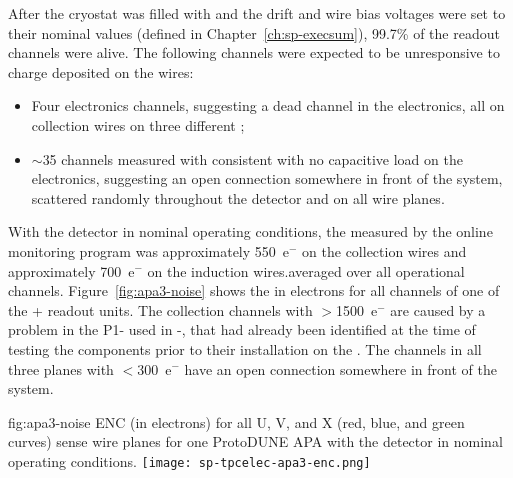 After the cryostat was filled with  and the drift and wire 
bias voltages were set to their nominal values (defined in Chapter~\ref{ch:sp-execsum}), 
99.7\% of the  readout channels were alive. The following 
channels were expected to be unresponsive to charge deposited on the wires:
\begin{itemize}
\item{Four electronics channels, suggesting a dead channel in the electronics, 
all on collection wires on three different ;}
\item{$\sim$35 channels measured with consistent with no capacitive load 
on the  electronics, suggesting an open connection somewhere in 
front of the  system, scattered randomly throughout the detector 
and on all wire planes.}
\end{itemize}
With the detector in nominal operating conditions, the  
measured by the online monitoring program was approximately 550~e$^-$ 
on the collection wires and approximately 700~e$^-$ on the induction
wires.averaged over all operational channels. Figure~\ref{fig:apa3-noise} 
shows the  in electrons for all channels of one of the 
+ readout units. The collection channels with 
$>$1500~e$^-$ are caused by a problem in the P1-
 used in -, that had already
been identified at the time of testing the components prior to their
installation on the . The channels in all three planes 
with $<$300~e$^-$ have an open connection somewhere in 
front of the  system.

\begin{dunefigure}
{fig:apa3-noise}
{ENC (in electrons) for all U, V, and X (red, blue, and green curves) sense 
wire planes for one ProtoDUNE APA with the detector in nominal operating 
conditions.}
\texttt{[image: sp-tpcelec-apa3-enc.png]}
\end{dunefigure}

